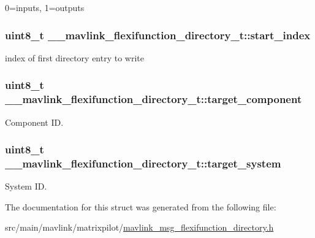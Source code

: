 0=inputs, 1=outputs 

\hypertarget{struct____mavlink__flexifunction__directory__t_a16c5309fb65a5af3b2171ddb619cff3c}{
\subsubsection[{start\+\_\+index}]{\setlength{\rightskip}{0pt plus 5cm}uint8\+\_\+t \+\_\+\+\_\+mavlink\+\_\+flexifunction\+\_\+directory\+\_\+t\+::start\+\_\+index}}\label{struct____mavlink__flexifunction__directory__t_a16c5309fb65a5af3b2171ddb619cff3c}


index of first directory entry to write 

\hypertarget{struct____mavlink__flexifunction__directory__t_af66137a8469d8019c764f552cd9ff111}{
\subsubsection[{target\+\_\+component}]{\setlength{\rightskip}{0pt plus 5cm}uint8\+\_\+t \+\_\+\+\_\+mavlink\+\_\+flexifunction\+\_\+directory\+\_\+t\+::target\+\_\+component}}\label{struct____mavlink__flexifunction__directory__t_af66137a8469d8019c764f552cd9ff111}


Component I\+D. 

\hypertarget{struct____mavlink__flexifunction__directory__t_a6847f95c21f1bba64e6aa658b93334ca}{
\subsubsection[{target\+\_\+system}]{\setlength{\rightskip}{0pt plus 5cm}uint8\+\_\+t \+\_\+\+\_\+mavlink\+\_\+flexifunction\+\_\+directory\+\_\+t\+::target\+\_\+system}}\label{struct____mavlink__flexifunction__directory__t_a6847f95c21f1bba64e6aa658b93334ca}


System I\+D. 



The documentation for this struct was generated from the following file\+:\begin{DoxyCompactItemize}
\item 
src/main/mavlink/matrixpilot/\hyperlink{mavlink__msg__flexifunction__directory_8h}{mavlink\+\_\+msg\+\_\+flexifunction\+\_\+directory.\+h}\end{DoxyCompactItemize}
